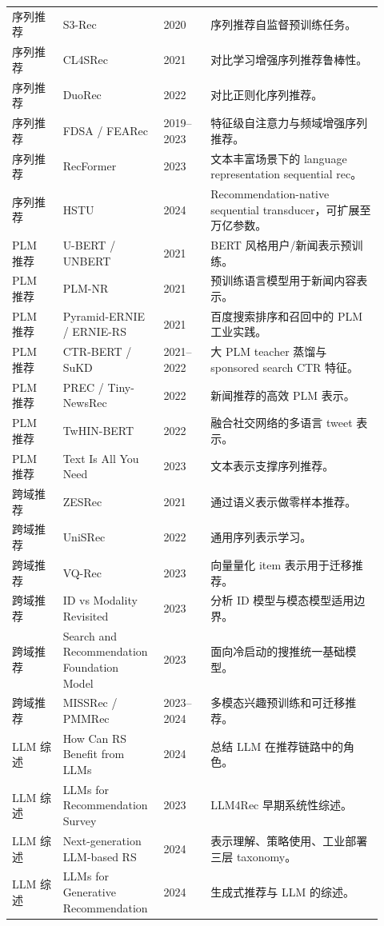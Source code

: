 \documentclass[UTF8,fontset=fandol,11pt]{ctexart}
\begin{document}
\begin{longtable}{@{}p{0.13\linewidth}p{0.23\linewidth}p{0.12\linewidth}p{0.44\linewidth}@{}}
序列推荐 & S3-Rec & 2020 & 序列推荐自监督预训练任务。\\
序列推荐 & CL4SRec & 2021 & 对比学习增强序列推荐鲁棒性。\\
序列推荐 & DuoRec & 2022 & 对比正则化序列推荐。\\
序列推荐 & FDSA / FEARec & 2019--2023 & 特征级自注意力与频域增强序列推荐。\\
序列推荐 & RecFormer & 2023 & 文本丰富场景下的 language representation sequential rec。\\
序列推荐 & HSTU & 2024 & Recommendation-native sequential transducer，可扩展至万亿参数。\\
PLM 推荐 & U-BERT / UNBERT & 2021 & BERT 风格用户/新闻表示预训练。\\
PLM 推荐 & PLM-NR & 2021 & 预训练语言模型用于新闻内容表示。\\
PLM 推荐 & Pyramid-ERNIE / ERNIE-RS & 2021 & 百度搜索排序和召回中的 PLM 工业实践。\\
PLM 推荐 & CTR-BERT / SuKD & 2021--2022 & 大 PLM teacher 蒸馏与 sponsored search CTR 特征。\\
PLM 推荐 & PREC / Tiny-NewsRec & 2022 & 新闻推荐的高效 PLM 表示。\\
PLM 推荐 & TwHIN-BERT & 2022 & 融合社交网络的多语言 tweet 表示。\\
PLM 推荐 & Text Is All You Need & 2023 & 文本表示支撑序列推荐。\\
跨域推荐 & ZESRec & 2021 & 通过语义表示做零样本推荐。\\
跨域推荐 & UniSRec & 2022 & 通用序列表示学习。\\
跨域推荐 & VQ-Rec & 2023 & 向量量化 item 表示用于迁移推荐。\\
跨域推荐 & ID vs Modality Revisited & 2023 & 分析 ID 模型与模态模型适用边界。\\
跨域推荐 & Search and Recommendation Foundation Model & 2023 & 面向冷启动的搜推统一基础模型。\\
跨域推荐 & MISSRec / PMMRec & 2023--2024 & 多模态兴趣预训练和可迁移推荐。\\
LLM 综述 & How Can RS Benefit from LLMs & 2024 & 总结 LLM 在推荐链路中的角色。\\
LLM 综述 & LLMs for Recommendation Survey & 2023 & LLM4Rec 早期系统性综述。\\
LLM 综述 & Next-generation LLM-based RS & 2024 & 表示理解、策略使用、工业部署三层 taxonomy。\\
LLM 综述 & LLMs for Generative Recommendation & 2024 & 生成式推荐与 LLM 的综述。\\

\end{longtable}
\end{document}
